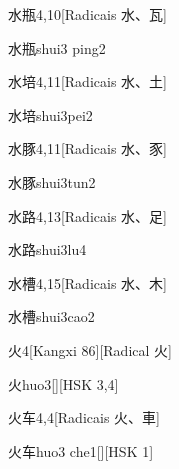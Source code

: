 \begin{entry}{水瓶}{4,10}[Radicais ⽔、⽡]
  \begin{phonetics}{水瓶}{shui3 ping2}
  \end{phonetics}
\end{entry}

\begin{entry}{水培}{4,11}[Radicais ⽔、⼟]
  \begin{phonetics}{水培}{shui3pei2}
  \end{phonetics}
\end{entry}

\begin{entry}{水豚}{4,11}[Radicais ⽔、⾗]
  \begin{phonetics}{水豚}{shui3tun2}
  \end{phonetics}
\end{entry}

\begin{entry}{水路}{4,13}[Radicais ⽔、⾜]
  \begin{phonetics}{水路}{shui3lu4}
  \end{phonetics}
\end{entry}

\begin{entry}{水槽}{4,15}[Radicais ⽔、⽊]
  \begin{phonetics}{水槽}{shui3cao2}
  \end{phonetics}
\end{entry}

\begin{entry}{火}{4}[Kangxi 86][Radical ⽕]
  \begin{phonetics}{火}{huo3}[][HSK 3,4]
  \end{phonetics}
\end{entry}

\begin{entry}{火车}{4,4}[Radicais ⽕、⾞]
  \begin{phonetics}{火车}{huo3 che1}[][HSK 1]
  \end{phonetics}
\end{entry}

